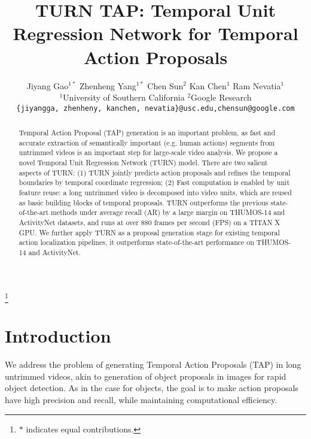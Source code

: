 \documentclass[10pt,twocolumn,letterpaper]{article}
\begin{document}
\title{TURN TAP: Temporal Unit Regression Network for Temporal Action Proposals}

\author{Jiyang Gao$^{1*}$ \quad Zhenheng Yang$^{1*}$ \quad Chen Sun$^2$  \quad Kan Chen$^1$ \quad Ram Nevatia$^1$ \\
$^1$University of Southern California \qquad $^2$Google Research \\
{\tt\small \{jiyangga, zhenheny, kanchen, nevatia\}@usc.edu,\quad chensun@google.com} 
}

\maketitle

\newcommand\blfootnote[1]{\begingroup
  \renewcommand\thefootnote{}\footnote{#1}\addtocounter{footnote}{-1}\endgroup
}

\blfootnote{$*$ indicates equal contributions.}


\begin{abstract}
  Temporal Action Proposal (TAP) generation is an important problem, as fast and accurate extraction of semantically important (e.g. human actions) segments from untrimmed videos is an important step for large-scale video analysis. We propose a novel Temporal Unit Regression Network (TURN) model. There are two salient aspects of TURN: (1) TURN jointly predicts action proposals and refines the temporal boundaries by temporal coordinate regression; (2) Fast computation is enabled by unit feature reuse: a long untrimmed video is decomposed into video units, which are reused as basic building blocks of temporal proposals. TURN outperforms the previous state-of-the-art methods under average recall (AR) by a large margin on THUMOS-14 and ActivityNet datasets, and runs at over 880 frames per second (FPS) on a TITAN X GPU. We further apply TURN as a proposal generation stage for existing temporal action localization pipelines, it outperforms state-of-the-art performance on THUMOS-14 and ActivityNet. \end{abstract}

\section{Introduction}



We address the problem of generating Temporal Action Proposals (TAP) in long untrimmed videos, akin to generation of object proposals in images for rapid object detection. As in the case for objects, the goal is to make action proposals have high precision and recall, while maintaining computational efficiency. 
\end{document}
